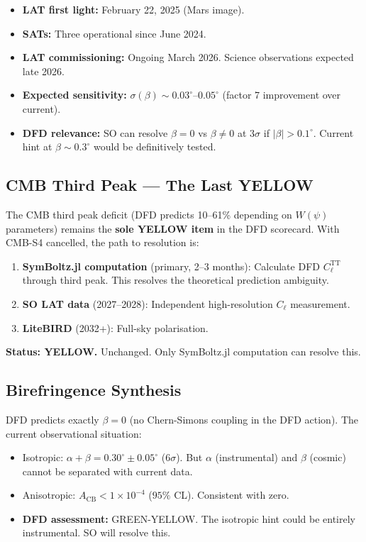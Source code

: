 \documentclass[11pt,a4paper]{article}
\begin{document}
\begin{itemize}
\item \textbf{LAT first light:} February 22, 2025 (Mars image).
\item \textbf{SATs:} Three operational since June 2024.
\item \textbf{LAT commissioning:} Ongoing March 2026. Science observations expected late 2026.
\item \textbf{Expected sensitivity:} $\sigma(\beta) \sim 0.03^\circ$--$0.05^\circ$ (factor 7 improvement over current).
\item \textbf{DFD relevance:} SO can resolve $\beta = 0$ vs $\beta \neq 0$ at $3\sigma$ if $|\beta| > 0.1^\circ$. Current hint at $\beta \sim 0.3^\circ$ would be definitively tested.
\end{itemize}

\subsection{CMB Third Peak --- The Last YELLOW}

The CMB third peak deficit (DFD predicts 10--61\% depending on $W(\psi)$ parameters) remains the \textbf{sole YELLOW item} in the DFD scorecard. With CMB-S4 cancelled, the path to resolution is:

\begin{enumerate}
\item \textbf{SymBoltz.jl computation} (primary, 2--3 months): Calculate DFD $C_\ell^\mathrm{TT}$ through third peak. This resolves the theoretical prediction ambiguity.
\item \textbf{SO LAT data} (2027--2028): Independent high-resolution $C_\ell$ measurement.
\item \textbf{LiteBIRD} (2032+): Full-sky polarisation.
\end{enumerate}

\textbf{Status: YELLOW.} Unchanged. Only SymBoltz.jl computation can resolve this.

\subsection{Birefringence Synthesis}

DFD predicts exactly $\beta = 0$ (no Chern-Simons coupling in the DFD action). The current observational situation:

\begin{itemize}
\item Isotropic: $\alpha + \beta = 0.30^\circ \pm 0.05^\circ$ ($6\sigma$). But $\alpha$ (instrumental) and $\beta$ (cosmic) cannot be separated with current data.
\item Anisotropic: $A_\mathrm{CB} < 1 \times 10^{-4}$ ($95\%$ CL). Consistent with zero.
\item \textbf{DFD assessment:} GREEN-YELLOW. The isotropic hint could be entirely instrumental. SO will resolve this.
\end{itemize}
\end{document}
